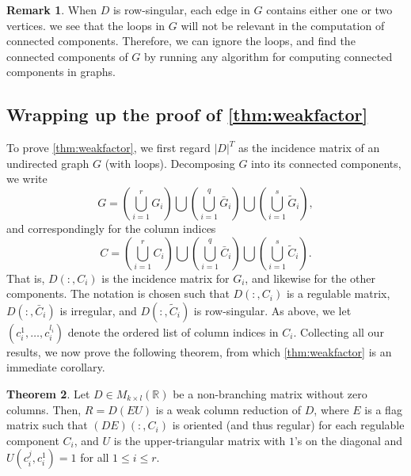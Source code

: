 \documentclass{article}
\theoremstyle{definition}
\newtheorem{theorem}{Theorem}[section]
\newtheorem{remark}[theorem]{Remark}
\begin{document}
\begin{remark}
    When $D$ is row-singular, each edge in $G$ contains either one or two vertices. 
    we see that the loops in $G$ will not be relevant in the computation of connected components. Therefore, we can ignore the loops, and find the connected components of $G$ by running any algorithm for computing connected components in graphs.
\end{remark}

\subsection{Wrapping up the proof of  \cref{thm:weakfactor}}\label{subsec:non_branching_mtx}
To prove \cref{thm:weakfactor}, we first regard $|D|^T$ as the incidence matrix of an undirected graph $G$ (with loops).
Decomposing $G$ into its connected components, we write 
\[
G = \left(\bigcup_{i=1}^r G_i\right) \bigcup \left(\bigcup_{i=1}^q \bar{G}_i\right)\bigcup \left(\bigcup_{i=1}^s \widetilde{G}_i\right),
\]
and correspondingly for the column indices
\[
C = \left(\bigcup_{i=1}^r C_i\right) \bigcup \left(\bigcup_{i=1}^q \bar{C}_i\right)\bigcup \left(\bigcup_{i=1}^s \widetilde{C}_i\right).\]
That is, $D(:,C_i)$ is the incidence matrix for $G_i$, and likewise for the other components. The notation is chosen such that $D(:, C_i)$ is a regulable matrix, $D(:, \bar{C}_i)$ is irregular, and $D(:, \widetilde{C}_i)$ is row-singular. As above, we let $(c_i^{1}, \ldots, c_i^{l_i})$ denote the ordered list of column indices in $C_i$. 
Collecting all our results, we now prove the following theorem, from which \cref{thm:weakfactor} is an immediate corollary. 
\begin{theorem}\label{thm:main_thm}
Let $D\in M_{k\times l}(\mathbb{R})$ be a non-branching matrix without zero columns. Then,
$R = D(EU)$
is a weak column reduction of $D$, where $E$ is a flag matrix such that $(DE)(:,C_i)$ is oriented (and thus regular) for each regulable component $C_i$, and $U$ is the upper-triangular matrix with $1$'s on the diagonal and $U(c_i^{j}, c_i^{1}) = 1$ for all $1\leq i \leq r$.
\end{theorem}
\end{document}
